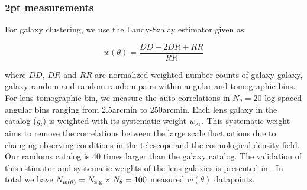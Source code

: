 \documentclass[fleqn,usenatbib]{mnras}
\newcommand{\gammat}{\ensuremath{\gamma_{\rm t}(\theta)}}
\newcommand{\wtheta}{\ensuremath{w(\theta)}}
\newcommand{\blue}[1]{\textcolor{blue}{#1}}
\begin{document}
\subsubsection{2pt measurements}\label{sec:2pt_data}

For galaxy clustering, we use the Landy-Szalay estimator given as:
\begin{linenomath*}
\begin{equation}
    w(\theta) = \frac{DD - 2DR + RR}{RR}
\end{equation}
\end{linenomath*}
where $DD$, $DR$ and $RR$ are normalized weighted number counts of galaxy-galaxy, galaxy-random and random-random pairs within angular and tomographic bins. For lens tomographic bin, we measure the auto-correlations in $N_{\theta} = 20$ log-spaced angular bins ranging from 2.5arcmin to 250arcmin. Each lens galaxy in the catalog ($g_i$) is weighted with its systematic weight $w_{\rm g_i}$. This systematic weight aims to remove the correlations between the large scale fluctuations due to changing observing conditions in the telescope and the cosmological density field. Our randoms catalog is 40 times larger than the galaxy catalog. The validation of this estimator and systematic weights of the lens galaxies is presented in \cite{y3-galaxyclustering}. In total we have $N_{\wtheta} = N_{\rm z,g} \times N_{\theta} = 100$ measured $\wtheta$ datapoints. 
\end{document}
